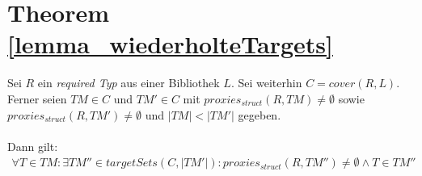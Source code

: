 \section*{Theorem \ref{lemma_wiederholteTargets}}
\begin{theorem*}
Sei $R$ ein \emph{required Typ} aus einer Bibliothek $L$. Sei weiterhin $\mathit{C} = \mathit{cover(R,L)}$. Ferner seien $\mathit{TM} \in \mathit{C}$ und $\mathit{TM'} \in \mathit{C}$ mit $\mathit{proxies_{struct}(R,TM)} \neq \emptyset$ sowie $\mathit{proxies_{struct}(R,TM')} \neq \emptyset$ und $|\mathit{TM}| < |\mathit{TM'}|$ gegeben.
\\\\
Dann gilt:
\begin{gather*}
\forall \mathit{T} \in \mathit{TM}: \exists \mathit{TM''} \in \mathit{targetSets(C,|\mathit{TM'}|)}: \mathit{proxies_{struct}(R,TM'')} \neq \emptyset \wedge \mathit{T} \in \mathit{TM''} 
\end{gather*}
\end{theorem*}
